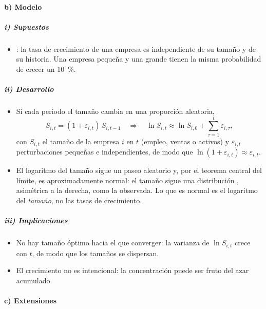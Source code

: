\documentclass[11pt]{article}
\begin{document}
\paragraph{b) Modelo}

\subparagraph{i) Supuestos}

\begin{itemize}
\item {}: la tasa de crecimiento de una empresa es independiente de su tamaño y de su historia. Una empresa pequeña y una grande tienen la misma probabilidad de crecer un 10~\%.
\end{itemize}

\subparagraph{ii) Desarrollo}

\begin{itemize}
\item Si cada periodo el tamaño cambia en una proporción aleatoria,
  \begin{equation}\label{eq:gibrat}
  S_{i,t}=(1+\varepsilon_{i,t})\,S_{i,t-1}\quad\Longrightarrow\quad \ln S_{i,t}\approx \ln S_{i,0}+\sum_{\tau=1}^{t}\varepsilon_{i,\tau},
  \end{equation}
  con $S_{i,t}$ el tamaño de la empresa $i$ en $t$ (empleo, ventas o activos) y $\varepsilon_{i,t}$ perturbaciones pequeñas e independientes, de modo que $\ln(1+\varepsilon_{i,t})\approx\varepsilon_{i,t}$.
\item El logaritmo del tamaño sigue un paseo aleatorio y, por el teorema central del límite, es aproximadamente normal: el tamaño sigue una distribución , asimétrica a la derecha, como la observada. Lo que es normal es el logaritmo del \emph{tamaño}, no las tasas de crecimiento.
\end{itemize}

\subparagraph{iii) Implicaciones}

\begin{itemize}
\item No hay tamaño óptimo hacia el que converger: la varianza de $\ln S_{i,t}$ crece con $t$, de modo que los tamaños se dispersan.
\item El crecimiento no es intencional: la concentración puede ser fruto del azar acumulado.
\end{itemize}

\paragraph{c) Extensiones}
\end{document}

